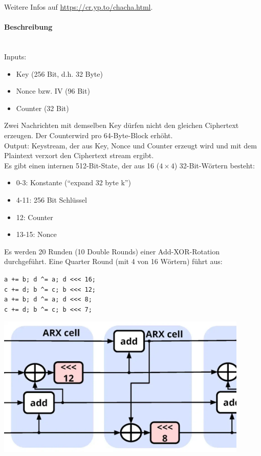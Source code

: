 \noindent Weitere Infos auf \url{https://cr.yp.to/chacha.html}.

\paragraph{Beschreibung} \mbox{} \\

Inputs:
\begin{itemize}
    \item Key (256 Bit, d.h. 32 Byte)
    \item Nonce bzw. IV (96 Bit)
    \item Counter (32 Bit)
\end{itemize}

\noindent Zwei Nachrichten mit demselben Key dürfen nicht den gleichen Ciphertext erzeugen. Der Counterwird pro 64-Byte-Block erhöht. \\

\noindent Output: Keystream, der aus Key, Nonce und Counter erzeugt wird und mit dem Plaintext verxort den Ciphertext stream ergibt.\\

Es gibt einen internen 512-Bit-State, der aus 16 ($4\times 4$) 32-Bit-Wörtern besteht:
\begin{itemize}
    \item 0-3: Konstante (``expand 32 byte k'')
    \item 4-11: 256 Bit Schlüssel 
    \item 12: Counter
    \item 13-15: Nonce
\end{itemize}

Es werden 20 Runden (10 Double Rounds) einer Add-XOR-Rotation durchgeführt. Eine Quarter Round (mit 4 von 16 Wörtern) führt aus:

\begin{minipage}[c]{0.48\textwidth}
        \verb|a += b; d ^= a; d <<< 16;| \\
        \verb|c += d; b ^= c; b <<< 12;| \\
        \verb|a += b; d ^= a; d <<< 8;| \\
        \verb|c += d; b ^= c; b <<< 7;|
\end{minipage} \begin{minipage}[c]{0.48\textwidth}
    \centering
    \includegraphics[width=0.9\textwidth]{figures/fig7-chacha20-1024x576.png}
\end{minipage}


